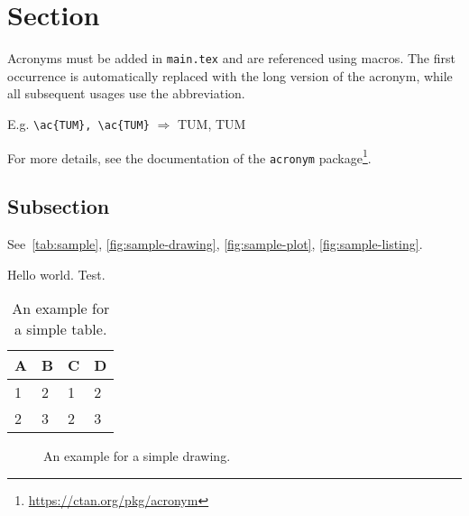 
\section{Section}

Acronyms must be added in \texttt{main.tex} and are referenced using macros.
The first occurrence is automatically replaced with the long version of the
acronym, while all subsequent usages use the abbreviation.

E.g. \texttt{\textbackslash ac\{TUM\}, \textbackslash ac\{TUM\}} $\Rightarrow$ \ac{TUM}, \ac{TUM}

For more details, see the documentation of the \texttt{acronym} package\footnote{\url{https://ctan.org/pkg/acronym}}.
\subsection{Subsection}

See~\autoref{tab:sample}, \autoref{fig:sample-drawing}, \autoref{fig:sample-plot}, \autoref{fig:sample-listing}.

Hello world. Test.

\begin{table}[htpb]
    \centering
    \begin{tabular}{l l l l}
        \toprule
        A & B & C & D \\
        \midrule
        1 & 2 & 1 & 2 \\
        2 & 3 & 2 & 3 \\
        \bottomrule
    \end{tabular}
    \caption[Example table]{An example for a simple table.}\label{tab:sample}
\end{table}

\begin{figure}[htpb]
    \centering
    \caption[Example drawing]{An example for a simple drawing.}\label{fig:sample-drawing}
\end{figure}

